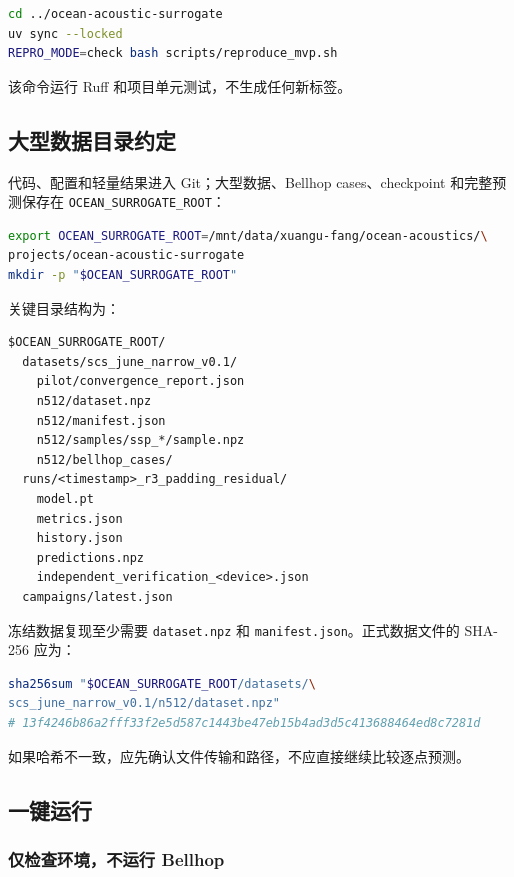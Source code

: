 \documentclass[UTF8,11pt]{ctexart}
\begin{document}
\begin{lstlisting}[style=repro,language=bash]
cd ../ocean-acoustic-surrogate
uv sync --locked
REPRO_MODE=check bash scripts/reproduce_mvp.sh
\end{lstlisting}

该命令运行 Ruff 和项目单元测试，不生成任何新标签。

\subsection{大型数据目录约定}

代码、配置和轻量结果进入 Git；大型数据、Bellhop cases、checkpoint 和完整预测保存在
\texttt{OCEAN\_SURROGATE\_ROOT}：

\begin{lstlisting}[style=repro,language=bash]
export OCEAN_SURROGATE_ROOT=/mnt/data/xuangu-fang/ocean-acoustics/\
projects/ocean-acoustic-surrogate
mkdir -p "$OCEAN_SURROGATE_ROOT"
\end{lstlisting}

关键目录结构为：

\begin{lstlisting}[style=repro]
$OCEAN_SURROGATE_ROOT/
  datasets/scs_june_narrow_v0.1/
    pilot/convergence_report.json
    n512/dataset.npz
    n512/manifest.json
    n512/samples/ssp_*/sample.npz
    n512/bellhop_cases/
  runs/<timestamp>_r3_padding_residual/
    model.pt
    metrics.json
    history.json
    predictions.npz
    independent_verification_<device>.json
  campaigns/latest.json
\end{lstlisting}

冻结数据复现至少需要 \texttt{dataset.npz} 和 \texttt{manifest.json}。正式数据文件的
SHA-256 应为：

\begin{lstlisting}[style=repro,language=bash]
sha256sum "$OCEAN_SURROGATE_ROOT/datasets/\
scs_june_narrow_v0.1/n512/dataset.npz"
# 13f4246b86a2fff33f2e5d587c1443be47eb15b4ad3d5c413688464ed8c7281d
\end{lstlisting}

如果哈希不一致，应先确认文件传输和路径，不应直接继续比较逐点预测。

\subsection{一键运行}

\subsubsection{仅检查环境，不运行 Bellhop}
\end{document}
